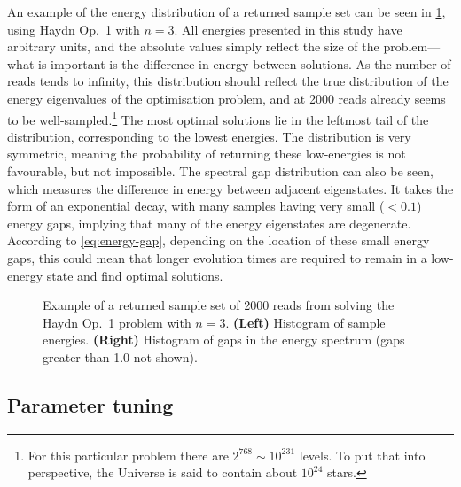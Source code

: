 \documentclass[twocolumn]{article}
\theoremstyle{definition}
\begin{document}
An example of the energy distribution of a returned sample set can be seen in \cref{fig:histograms}, using Haydn Op.\ 1 with $n=3$. All energies presented in this study have arbitrary units, and the absolute values simply reflect the size of the problem---what is important is the difference in energy between solutions. As the number of reads tends to infinity, this distribution should reflect the true distribution of the energy eigenvalues of the optimisation problem, and at \num{2000} reads already seems to be well-sampled.\footnote{For this particular problem there are $2^{768}\sim 10^{231}$ levels. To put that into perspective, the Universe is said to contain about $10^{24}$ stars.} The most optimal solutions lie in the leftmost tail of the distribution, corresponding to the lowest energies. The distribution is very symmetric, meaning the probability of returning these low-energies is not favourable, but not impossible.
The spectral gap distribution can also be seen, which measures the difference in energy between adjacent eigenstates. It takes the form of an exponential decay, with many samples having very small ($<0.1$) energy gaps, implying that many of the energy eigenstates are degenerate. According to \cref{eq:energy-gap}, depending on the location of these small energy gaps, this could mean that longer evolution times are required to remain in a low-energy state and find optimal solutions.

\begin{figure}[t]
    \centering\footnotesize
    
    \caption{Example of a returned sample set of \num{2000} reads from solving the Haydn Op.\ 1 problem with $n=3$. \textbf{(Left)} Histogram of sample energies. \textbf{(Right)} Histogram of gaps in the energy spectrum (gaps greater than \num{1.0} not shown).}
    \label{fig:histograms}
\end{figure}

\subsection{Parameter tuning}
\end{document}
